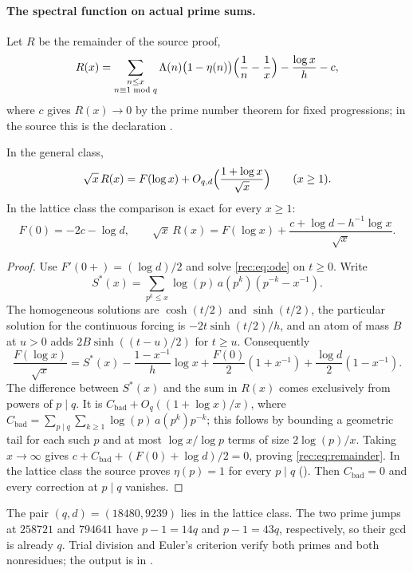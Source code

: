 \paragraph{The spectral function on actual prime sums.}
Let $R$ be the remainder of the source proof,
\[
 R(x)=\sum_{\substack{n\le x\\n\equiv1\bmod q}}\Lambda(n)\bigl(1-\eta(n)\bigr)
   \Bigl(\frac1n-\frac1x\Bigr)-\frac{\log x}h-c,
\]
where $c$ gives $R(x)\to0$ by the prime number theorem for fixed progressions; in the
source this is the declaration .

\begin{proposition}[\stG]\label{rec:prop:remainder}
In the general class,
\begin{equation}\label{rec:eq:remainder}
 \sqrt x\,R(x)=F(\log x)+O_{q,d}\Bigl(\frac{1+\log x}{\sqrt x}\Bigr)\qquad(x\ge1).
\end{equation}
In the lattice class the comparison is exact for every $x\ge1$:
\[
 F(0)=-2c-\log d,\qquad
 \sqrt x\,R(x)=F(\log x)+\frac{c+\log d-h^{-1}\log x}{\sqrt x} .
\]
\end{proposition}
\begin{proof}
Use $F'(0+)=(\log d)/2$ and solve \eqref{rec:eq:ode} on $t\ge0$. Write
\[
 S^*(x)=\sum_{p^k\le x}\log(p)\,a(p^k)(p^{-k}-x^{-1}).
\]
The homogeneous solutions are
$\cosh(t/2)$ and $\sinh(t/2)$, the particular solution for the continuous forcing is
$-2t\sinh(t/2)/h$, and an atom of mass $B$ at $u>0$ adds $2B\sinh((t-u)/2)$ for $t\ge u$.
Consequently
\[
 \frac{F(\log x)}{\sqrt x}=S^*(x)-\frac{1-x^{-1}}h\log x+\frac{F(0)}2(1+x^{-1})
 +\frac{\log d}2(1-x^{-1}).
\]
The difference between $S^*(x)$ and the sum in $R(x)$ comes exclusively from powers of
$p\mid q$. It is $C_{\mathrm{bad}}+O_q((1+\log x)/x)$, where
$C_{\mathrm{bad}}=\sum_{p\mid q}\sum_{k\ge1}\log(p)\,a(p^k)p^{-k}$; this follows by bounding
a geometric tail for each such $p$ and at most $\log x/\log p$ terms of size $2\log(p)/x$.
Taking $x\to\infty$ gives $c+C_{\mathrm{bad}}+(F(0)+\log d)/2=0$, proving
\eqref{rec:eq:remainder}. In the lattice class the source proves $\eta(p)=1$ for every
$p\mid q$ (). Then $C_{\mathrm{bad}}=0$ and every
correction at $p\mid q$ vanishes.
\end{proof}

\begin{example}\label{rec:ex:9239}
The pair $(q,d)=(18480,9239)$ lies in the lattice class. The two prime jumps at $258721$ and
$794641$ have $p-1=14q$ and $p-1=43q$, respectively, so their gcd is already $q$. Trial
division and Euler's criterion verify both primes and both nonresidues; the output is in
.
\end{example}

